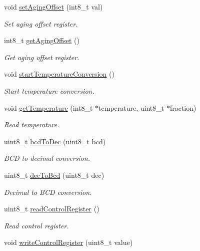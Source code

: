 \begin{DoxyCompactItemize}
void \hyperlink{class_d_s3231_a18f8f98c3d1e8c6fdb611cbb97bbdee0}{set\+Aging\+Offset} (int8\+\_\+t val)
\begin{DoxyCompactList}\small\item\em Set aging offset register. \end{DoxyCompactList}\item 
int8\+\_\+t \hyperlink{class_d_s3231_a4ef9862e078068b915285cd264584449}{get\+Aging\+Offset} ()
\begin{DoxyCompactList}\small\item\em Get aging offset register. \end{DoxyCompactList}\item 
void \hyperlink{class_d_s3231_ad2b2d423930fca422dbc6adfd2a8e571}{start\+Temperature\+Conversion} ()
\begin{DoxyCompactList}\small\item\em Start temperature conversion. \end{DoxyCompactList}\item 
void \hyperlink{class_d_s3231_a334f37eca94eb3cd7d2c780e8268864c}{get\+Temperature} (int8\+\_\+t $\ast$temperature, uint8\+\_\+t $\ast$fraction)
\begin{DoxyCompactList}\small\item\em Read temperature. \end{DoxyCompactList}\item 
uint8\+\_\+t \hyperlink{class_d_s3231_aa49b293f3fdcc222e0f86cc2bbdf1476}{bcd\+To\+Dec} (uint8\+\_\+t bcd)
\begin{DoxyCompactList}\small\item\em B\+CD to decimal conversion. \end{DoxyCompactList}\item 
uint8\+\_\+t \hyperlink{class_d_s3231_a8883c7df954dc7682a40825790631230}{dec\+To\+Bcd} (uint8\+\_\+t dec)
\begin{DoxyCompactList}\small\item\em Decimal to B\+CD conversion. \end{DoxyCompactList}\item 
uint8\+\_\+t \hyperlink{class_d_s3231_a53ae4553629d91e3ab06c22d03fe09e2}{read\+Control\+Register} ()
\begin{DoxyCompactList}\small\item\em Read control register. \end{DoxyCompactList}\item 
void \hyperlink{class_d_s3231_a563f7fd8e44c26f6bd0b035ad9852caa}{write\+Control\+Register} (uint8\+\_\+t value)

\end{DoxyCompactItemize}

